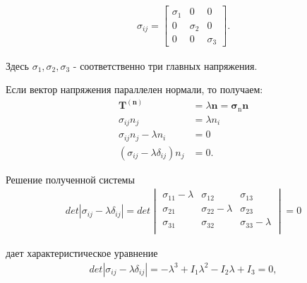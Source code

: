 \begin{align}
\sigma_{ij} = \begin{bmatrix} \sigma_1 & 0 & 0\\ 
0 & \sigma_2 & 0\\ 
0 & 0 & \sigma_3 \end{bmatrix}.
\end{align}

Здесь $\sigma_1, \sigma_2, \sigma_3$ - соответственно три главных напряжения.

Если вектор напряжения параллелен нормали, то получаем:
\begin{align}
\mathbf{T}^{(\mathbf{n})} &= \lambda \mathbf{n}= \mathbf{\sigma}_\mathrm n \mathbf{n} \nonumber\\
\sigma_{ij}n_j &= \lambda n_i \nonumber\\ 
\sigma_{ij}n_j - \lambda n_i &= 0 \nonumber\\ 
(\sigma_{ij} - \lambda\delta_{ij}) n_j &= 0.
\end{align}

Решение полученной системы
\begin{align}
det|\sigma_{ij}- \lambda\delta_{ij}|=det \begin{vmatrix} \sigma_{11} - \lambda & \sigma_{12} & \sigma_{13} \\ \sigma_{21} & \sigma_{22} - \lambda & \sigma_{23} \\ \sigma_{31}& \sigma_{32} & \sigma_{33} - \lambda \\ \end{vmatrix}=0
\end{align}

дает характеристическое уравнение
\begin{align}
det|\sigma_{ij}- \lambda\delta_{ij}| = -\lambda^3 + I_1\lambda^2 - I_2\lambda + I_3=0,
\end{align}

